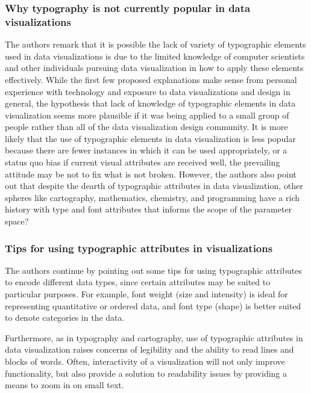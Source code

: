 \documentclass[]{book}
\begin{document}
\subsubsection{Why typography is not currently popular in data
visualizations}\label{why-typography-is-not-currently-popular-in-data-visualizations}

The authors remark that it is possible the lack of variety of
typographic elements used in data visualizations is due to the limited
knowledge of computer scientists and other individuals pursuing data
visualization in how to apply these elements effectively. While the
first few proposed explanations make sense from personal experience with
technology and exposure to data visualizations and design in general,
the hypothesis that lack of knowledge of typographic elements in data
visualization seems more plausible if it was being applied to a small
group of people rather than all of the data visualization design
community. It is more likely that the use of typographic elements in
data visualization is less popular because there are fewer instances in
which it can be used appropriately, or a status quo bias if current
visual attributes are received well, the prevailing attitude may be not
to fix what is not broken. However, the authors also point out that
despite the dearth of typographic attributes in data visualization,
other spheres like cartography, mathematics, chemistry, and programming
have a rich history with type and font attributes that informs the scope
of the parameter space?

\subsubsection{Tips for using typographic attributes in
visualizations}\label{tips-for-using-typographic-attributes-in-visualizations}

The authors continue by pointing out some tips for using typographic
attributes to encode different data types, since certain attributes may
be suited to particular purposes. For example, font weight (size and
intensity) is ideal for representing quantitative or ordered data, and
font type (shape) is better suited to denote categories in the data.

Furthermore, as in typography and cartography, use of typographic
attributes in data visualization raises concerns of legibility and the
ability to read lines and blocks of words. Often, interactivity of a
visualization will not only improve functionality, but also provide a
solution to readability issues by providing a means to zoom in on small
text.
\end{document}
